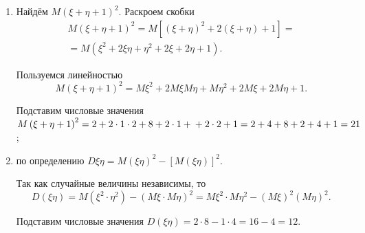 \begin{enumerate}[label=\alph*)]
\item Найдём $M \left( \xi + \eta + 1 \right)^2$.
Раскроем скобки
\begin{equation*}
\begin{split}
M \left( \xi + \eta + 1 \right)^2 =
M \left[ \left( \xi + \eta \right)^2 + 2 \left( \xi + \eta \right) + 1 \right] = \\
= M \left( \xi^2 + 2 \xi \eta + \eta^2 + 2 \xi + 2 \eta + 1 \right).
\end{split}
\end{equation*}

Пользуемся линейностью
$$M \left( \xi + \eta + 1 \right)^2 =
M \xi^2 + 2 M \xi M \eta + M \eta^2 + 2M \xi + 2M \eta + 1.$$

Подставим числовые значения $M \left( \xi + \eta + 1 \right)^2 = 2 + 2 \cdot 1 \cdot 2 + 8 + 2 \cdot 1 + \\
+ 2 \cdot 2 + 1 = 2 + 4 + 8 + 2 + 4 + 1 = 21$;
\item по определению $D \xi \eta = M \left( \xi \eta \right)^2 - \left[ M \left( \xi \eta \right) \right]^2$.

Так как случайные величины независимы, то
$$D \left( \xi \eta \right) =
M \left( \xi^2 \cdot \eta^2 \right) - \left( M \xi \cdot M \eta \right)^2 =
M \xi^2 \cdot M \eta^2 - \left( M \xi \right)^2 \left( M \eta \right)^2.$$

Подставим числовые значения $D \left( \xi \eta \right) = 2 \cdot 8 - 1 \cdot 4 = 16 - 4 = 12$.
\end{enumerate}
